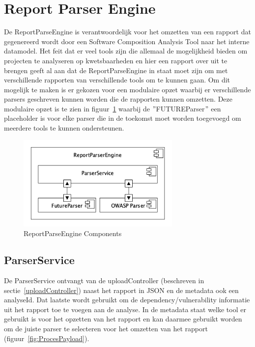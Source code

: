 \section{Report Parser Engine}\label{sec:report-parse-engine}
De ReportParseEngine is verantwoordelijk voor het omzetten van een rapport dat gegenereerd wordt door een Software Composition Analysis Tool naar het interne datamodel. Het feit dat er veel tools zijn die allemaal de mogelijkheid bieden om projecten te analyseren op kwetsbaarheden en hier een rapport over uit te brengen geeft al aan dat de ReportParseEngine in staat moet zijn om met verschillende rapporten van verschillende tools om te kunnen gaan. Om dit mogelijk te maken is er gekozen voor een modulaire opzet waarbij er verschillende parsers geschreven kunnen worden die de rapporten kunnen omzetten. Deze modulaire opzet is te zien in figuur~\ref{fig:ReportParseComponents} waarbij de $"$FUTUREParser$"$ een placeholder is voor elke parser die in de toekomst moet worden toegevoegd om meerdere tools te kunnen ondersteunen.
\begin{figure}[bth]
    \myfloatalign
    \includegraphics[width=8cm]{gfx/umlet/exports/ReportParserComponents}
    \caption{ReportParseEngine Components}
    \label{fig:ReportParseComponents}
\end{figure}

\subsection{ParserService}\label{subsec:reportservice}
De ParserService ontvangt van de uploadController (beschreven in sectie~\ref{uploadController}) naast het rapport in JSON en de metadata ook een analyseId. Dat laatste wordt gebruikt om de dependency/vulnerability informatie uit het rapport toe te voegen aan de analyse. In de metadata staat welke tool er gebruikt is voor het opzetten van het rapport en kan daarmee gebruikt worden om de juiste parser te selecteren voor het omzetten van het rapport (figuur~\ref{fig:ProcesPayload}).

